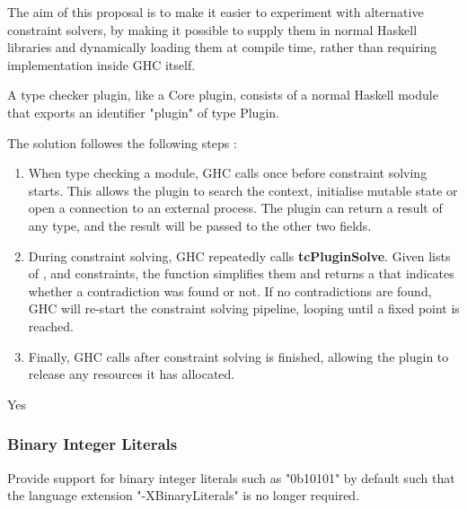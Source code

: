 \begin{wanted}
The aim of this proposal is to make it easier to experiment with
alternative constraint solvers, by making it possible to supply them
in normal Haskell libraries and dynamically loading them at compile
time, rather than requiring implementation inside GHC itself.
\end{wanted}

\begin{explication}
A type checker plugin, like a Core plugin, consists of a normal Haskell module that exports an identifier "plugin" of type Plugin.  \cite{wiki} 
\end{explication}

The solution followes the following steps  \cite{wiki}: 

\begin{enumerate}
    \item When type checking a module, GHC calls  once before constraint solving starts.  This allows the plugin to search the context, initialise mutable state or open a connection to an external process. The plugin can return a result of any type, and the result will be passed to the other two fields.
    
    \item  During constraint solving, GHC repeatedly calls \textbf{tcPluginSolve}.  Given lists of ,  and  constraints, the function  simplifies them and returns a  that indicates whether a contradiction was found or not. If no contradictions are found, GHC will re-start the constraint solving pipeline, looping until a fixed point is reached.
    
    \item  Finally, GHC calls  after constraint solving is finished, allowing the plugin to release any resources it has allocated.    
\end{enumerate}
  
\begin{new}
Yes
\end{new}



\subsubsection{Binary Integer Literals}

\begin{requirement}
Provide support for binary integer literals such as "0b10101" by default such that the language extension "-XBinaryLiterals" is no longer required.
\end{requirement}

